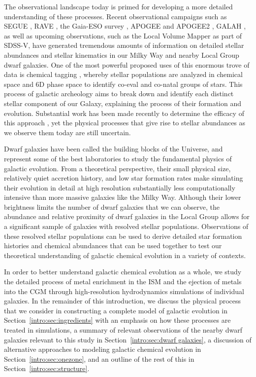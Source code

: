 The observational landscape today is primed for developing a more detailed understanding of these processes. Recent observational campaigns such as SEGUE \citep{Yanny2009}, RAVE \citep{Kunder2017}, the Gaia-ESO survey \citep{Gaia}, APOGEE and APOGEE2 \citep{APOGEE2010,APOGEE}, GALAH \citep{GALAH,Buder2018}, as well as upcoming observations, such as the Local Volume Mapper as part of SDSS-V, have generated tremendous amounts of information on detailed stellar abundances and stellar kinematics in our Milky Way and nearby Local Group dwarf galaxies. One of the most powerful proposed uses of this enormous trove of data is chemical tagging \citep{Freeman2002}, whereby stellar populations are analyzed in chemical space and 6D phase space to identify co-eval and co-natal groups of stars. This process of galactic archeology aims to break down and identify each distinct stellar component of our Galaxy, explaining the process of their formation and evolution. Substantial work has been made recently to determine the efficacy of this approach \citep[e.g.][]{Ting2012,Hogg2016,Jofre2017,Price-Jones2018,Armillotta2018}, yet the physical processes that give rise to stellar abundances as we observe them today are still uncertain.


Dwarf galaxies have been called the building blocks of the Universe, and represent some of the best laboratories to study the fundamental physics of galactic evolution. From a theoretical perspective, their small physical size, relatively quiet accretion history, and low star formation rates make simulating their evolution in detail at high resolution substantially less computationally intensive than more massive galaxies like the Milky Way. Although their lower brightness limits the number of dwarf galaxies that we can observe, the abundance and relative proximity of dwarf galaxies in the Local Group allows for a significant sample of galaxies with resolved stellar populations. Observations of these resolved stellar populations can be used to derive detailed star formation histories and chemical abundances that can be used together to test our theoretical understanding of galactic chemical evolution in a variety of contexts.

In order to better understand galactic chemical evolution as a whole, we study the detailed process of metal enrichment in the ISM and the ejection of metals into the CGM through high-resolution hydrodynamics simulations of individual galaxies. In the remainder of this introduction, we discuss the physical process that we consider in constructing a complete model of galactic evolution in Section~\ref{intro:sec:ingredients} with an emphasis on how these processes are treated in simulations, a summary of relevant observations of the nearby dwarf galaxies relevant to this study in Section~\ref{intro:sec:dwarf galaxies}, a discussion of alternative approaches to modeling galactic chemical evolution in Section~\ref{intro:sec:onezone}, and an outline of the rest of this \dissertation in Section~\ref{intro:sec:structure}.

